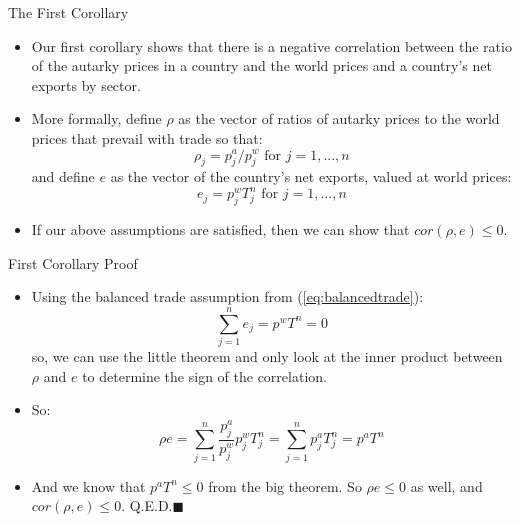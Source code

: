 \documentclass[aspectratio=169]{beamer}
\begin{document}
\begin{frame}{The First Corollary}

\begin{itemize}
    \item<1-> Our first corollary shows that there is a negative correlation between the ratio of the autarky prices in a country and the world prices and a country’s net exports by sector.
    \item<2-> More formally, define $ \rho $ as the vector of ratios of autarky prices to the world prices that prevail with trade so that:
    \begin{equation*}
        \rho_{j} = p_{j}^{a} / p_{j}^{w} \text{ for } j = 1,...,n
    \end{equation*}
    and define $ e $ as the vector of the country’s net exports, valued at world prices:
    \begin{equation*}
        e_{j} = p_{j}^{w} T_{j}^{n} \text{ for } j = 1,...,n
    \end{equation*}
    \item<3-> If our above assumptions are satisfied, then we can show that $ cor \left( \rho, e \right) \le 0 $.
\end{itemize}
    
\end{frame}


\begin{frame}{First Corollary Proof}

\begin{itemize}
    \item<1-> Using the balanced trade assumption from (\ref{eq:balancedtrade}):
    \begin{equation*}
        \sum_{j=1}^{n} e_{j} = p^{w} T^{n} = 0
    \end{equation*}
    so, we can use the little theorem and only look at the inner product between $ \rho $ and $ e $ to determine the sign of the correlation.
    \item<2-> So:
    \begin{equation*}
        \rho e = \sum_{j=1}^{n} \frac{p_{j}^{a}}{p_{j}^{w}} p_{j}^{w} T_{j}^{n} = \sum_{j=1}^{n} p_{j}^{a} T_{j}^{n} = p^{a} T^{n}
    \end{equation*}
    \item<3-> And we know that $ p^{a} T^{n} \le 0 $ from the big theorem.  So $ \rho e \le 0 $ as well, and $ cor \left( \rho, e \right) \le 0 $.  Q.E.D.$\blacksquare$
\end{itemize}
    
\end{frame}
\end{document}
